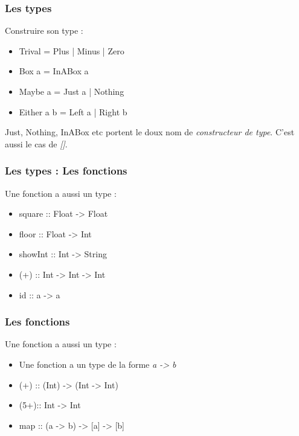\documentclass{beamer}
\begin{document}
\begin{frame}
\frametitle{Les types}
\begin{block}{Construire son type :}
\begin{itemize}
\item Trival = Plus | Minus | Zero
\pause
\item Box a = InABox a
\pause
\item Maybe a = Just a | Nothing
\pause
\item Either a b = Left a | Right b
\end{itemize}
\end{block}

\pause

Just, Nothing, InABox etc portent le doux nom de \emph{constructeur de type}. C'est aussi le cas de \emph{[]}.
\end{frame}



\begin{frame}
\frametitle{Les types : Les fonctions}
\begin{block}{Une fonction a aussi un type :}
\begin{itemize}
\item square  :: Float -> Float
\item floor   :: Float -> Int
\item showInt :: Int -> String
\item (+)     :: Int -> Int -> Int
\item id      :: a -> a
\end{itemize}
\end{block}

\end{frame}



\begin{frame}
\frametitle{Les fonctions}
\begin{block}{Une fonction a aussi un type :}
\begin{itemize}
\item Une fonction a un type de la forme \emph{a -> b}
\item (+) :: (Int) -> (Int -> Int)
\item (5+):: Int -> Int
\item map :: (a -> b) -> [a] -> [b]
\end{itemize}
\end{block}
\end{frame}
\end{document}
